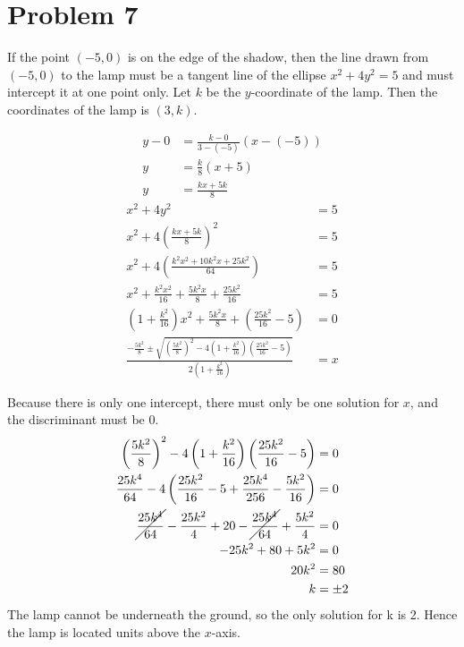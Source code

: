 \documentclass{article}
\begin{document}
\section*{Problem 7}
If the point $(-5,0)$ is on the edge of the shadow, then the line drawn from $(-5,0)$ to the lamp must be a tangent line of the ellipse $x^2+4y^2=5$ and must intercept it at one point only.
Let $k$ be the $y$-coordinate of the lamp. Then the coordinates of the lamp is $(3,k)$.

\centering
\begin{minipage}[t]{0.43\linewidth}
\begin{align*}
	y-0&=\frac{k-0}{3-(-5)}(x-(-5)) \\
	y&=\frac{k}{8}(x+5) \\
	y&=\frac{kx+5k}{8}
\end{align*}
\begin{align*}
	x^2+4y^2&=5 \\
	x^2+4\left(\frac{kx+5k}{8}\right)^2&=5 \\
	x^2+4\left(\frac{k^2x^2+10k^2x+25k^2}{64}\right)&=5 \\
	x^2+\frac{k^2x^2}{16}+\frac{5k^2x}{8}+\frac{25k^2}{16}&=5 \\
	\left(1+\frac{k^2}{16}\right)x^2+\frac{5k^2x}{8}+\left(\frac{25k^2}{16}-5\right)&=0 \\
	\frac{-\frac{5k^2}{8}\pm\sqrt{\left(\frac{5k^2}{8}\right)^2-4\left(1+\frac{k^2}{16}\right)\left(\frac{25k^2}{16}-5\right)}}{2\left(1+\frac{k^2}{16}\right)}&=x
\end{align*}
\end{minipage}
\hfill
\begin{minipage}[t]{0.52\linewidth}
\vspace*{10pt}
Because there is only one intercept, there must only be one solution for $x$, and the discriminant must be 0.
\begin{align*}
	\left(\frac{5k^2}{8}\right)^2-4\left(1+\frac{k^2}{16}\right)\left(\frac{25k^2}{16}-5\right)&=0 \\
	\frac{25k^4}{64}-4\left(\frac{25k^2}{16}-5+\frac{25k^4}{256}-\frac{5k^2}{16}\right)&=0 \\
	\cancel{\frac{25k^4}{64}}-\frac{25k^2}{4}+20-\cancel{\frac{25k^4}{64}}+\frac{5k^2}{4}&=0 \\
	-25k^2+80+5k^2&=0 \\
	20k^2&=80 \\
	k&=\pm2
\end{align*}
The lamp cannot be underneath the ground, so the only solution for k is 2. Hence the lamp is located  units above the $x$-axis.
\end{minipage}
\flushleft
\end{document}
